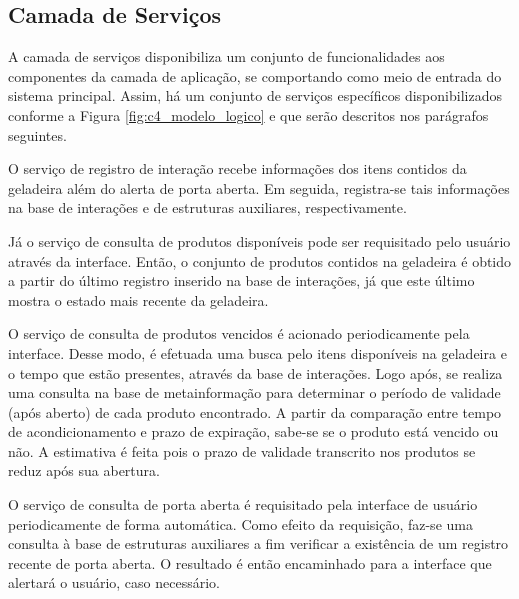 \subsection{Camada de Serviços}

A camada de serviços disponibiliza um conjunto de funcionalidades aos componentes da camada de aplicação, se comportando como meio de entrada do sistema principal. Assim, há um conjunto de serviços específicos disponibilizados conforme a Figura \ref{fig:c4_modelo_logico} e que serão descritos nos parágrafos seguintes.


O serviço de registro de interação recebe informações dos itens contidos da geladeira além do alerta de porta aberta. Em seguida, registra-se tais informações na base de interações e de estruturas auxiliares, respectivamente.



Já o serviço de consulta de produtos disponíveis pode ser requisitado pelo usuário através da interface. 
Então, o conjunto de produtos contidos na geladeira é obtido a partir do último registro inserido na base de interações, já que este último mostra o estado mais recente da geladeira.


O serviço de consulta de produtos vencidos é acionado periodicamente pela interface. Desse modo, é efetuada uma busca pelo itens disponíveis na geladeira e o tempo que estão presentes, através da base de interações. Logo após, se realiza uma consulta na base de metainformação para determinar o período de validade (após aberto) de cada produto encontrado. A partir da comparação entre tempo de acondicionamento e prazo de expiração, sabe-se se o produto está vencido ou não. A estimativa é feita pois o prazo de validade transcrito nos produtos se reduz após sua abertura.

O serviço de consulta de porta aberta é requisitado pela interface de usuário periodicamente de forma automática. Como efeito da requisição, faz-se uma consulta à base de estruturas auxiliares a fim verificar a existência de um registro recente de porta aberta. O resultado é então encaminhado para a interface que alertará o usuário, caso necessário.

